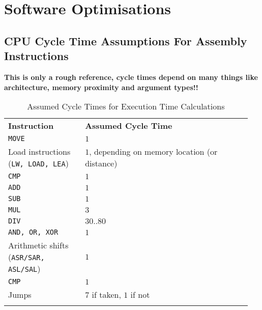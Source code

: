 \section{Software Optimisations }
	\subsection{CPU Cycle Time Assumptions For Assembly Instructions}
		{\color{red}\textbf{This is only a rough reference, cycle times depend on many things like architecture, memory proximity and argument types!!}}
		
		\begin{longtable}{|p{0.3\linewidth}|p{0.65\linewidth}|}
				\hline
				\textbf{Instruction}
					& \textbf{Assumed Cycle Time}\\
				\hhline{|=|=|}
				\texttt{MOVE}
					& $1$\\
				\hline
				Load instructions (\texttt{LW, LOAD, LEA})
					& $1$, depending on memory location (or distance)\\
				\hline
				\texttt{CMP}
					& $1$\\
				\hline
				\texttt{ADD}
					& $1$\\
				\hline
				\texttt{SUB}
					& $1$\\
				\hline
				\texttt{MUL}
					& $3$\\
				\hline
				\texttt{DIV}
					& $30..80$\\
				\hline
				\texttt{AND, OR, XOR}
					& $1$\\
				\hline
				Arithmetic shifts (\texttt{ASR/SAR, ASL/SAL})
					& $1$\\
				\hline
				\texttt{CMP}
					& $1$\\
				\hline
				Jumps 
					& $7$ if taken, $1$ if not\\
				\hline
				\caption{Assumed Cycle Times for Execution Time Calculations}
		\end{longtable}
	
